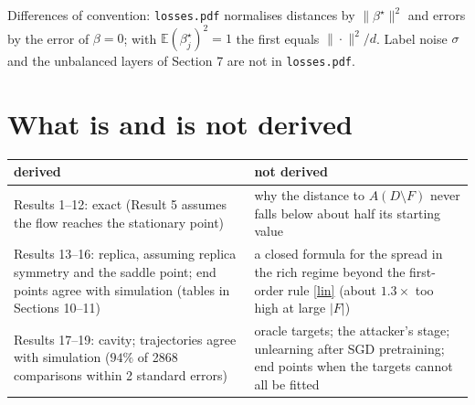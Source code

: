 \documentclass[10pt]{article}
\newcommand{\bs}{\beta^\star}\newcommand{\E}{\mathbb E}\newcommand{\asinh}{\operatorname{arcsinh}}\newcommand{\sk}{\sqrt k}
\begin{document}
Differences of convention: \texttt{losses.pdf} normalises distances by $\|\bs\|^2$ and errors by the error of $\beta=0$; with $\E(\bs_j)^2=1$ the first equals $\|\cdot\|^2/d$. Label noise $\sigma$ and the unbalanced layers of Section 7 are not in \texttt{losses.pdf}.

\section{What is and is not derived}
\begin{center}\small\begin{tabular}{@{}p{7.5cm}p{7.5cm}@{}}\toprule
derived & not derived\\\midrule
Results 1--12: exact (Result 5 assumes the flow reaches the stationary point) & why the distance to $A(D\setminus F)$ never falls below about half its starting value\\
Results 13--16: replica, assuming replica symmetry and the saddle point; end points agree with simulation (tables in Sections 10--11) & a closed formula for the spread in the rich regime beyond the first-order rule \eqref{lin} (about $1.3\times$ too high at large $|F|$)\\
Results 17--19: cavity; trajectories agree with simulation ($94\%$ of 2868 comparisons within 2 standard errors) & oracle targets; the attacker's stage; unlearning after SGD pretraining; end points when the targets cannot all be fitted\\\bottomrule
\end{tabular}\end{center}
\end{document}
